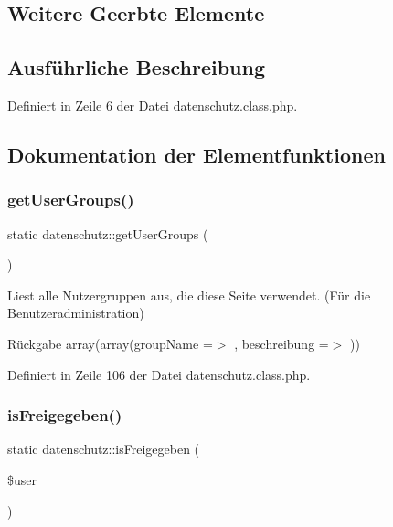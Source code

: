 \subsection*{Weitere Geerbte Elemente}


\subsection{Ausführliche Beschreibung}


Definiert in Zeile 6 der Datei datenschutz.\+class.\+php.



\subsection{Dokumentation der Elementfunktionen}
\mbox{\label{classdatenschutz_a1c4d1653e6e2897f18fe5bc50e479cd4}} 
\subsubsection{\texorpdfstring{get\+User\+Groups()}{getUserGroups()}}
{\footnotesize\ttfamily static datenschutz\+::get\+User\+Groups (\begin{DoxyParamCaption}{ }\end{DoxyParamCaption})\hspace{0.3cm}{\ttfamily [static]}}

Liest alle Nutzergruppen aus, die diese Seite verwendet. (Für die Benutzeradministration) \begin{DoxyReturn}{Rückgabe}
array(array(\textquotesingle{}group\+Name\textquotesingle{} =$>$ \textquotesingle{}\textquotesingle{}, \textquotesingle{}beschreibung\textquotesingle{} =$>$ \textquotesingle{}\textquotesingle{})) 
\end{DoxyReturn}


Definiert in Zeile 106 der Datei datenschutz.\+class.\+php.

\mbox{\label{classdatenschutz_ad42f7c79d164d11c9dd8c90e8afcf714}} 
\subsubsection{\texorpdfstring{is\+Freigegeben()}{isFreigegeben()}}
{\footnotesize\ttfamily static datenschutz\+::is\+Freigegeben (\begin{DoxyParamCaption}\item[{}]{\$user }\end{DoxyParamCaption})\hspace{0.3cm}{\ttfamily [static]}}


